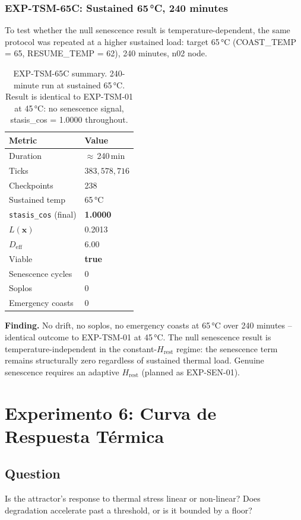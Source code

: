 \documentclass[11pt, a4paper]{article}
\begin{document}
\subsubsection*{EXP-TSM-65C: Sustained 65\,°C, 240 minutes}

To test whether the null senescence result is temperature-dependent,
the same protocol was repeated at a higher sustained load: target 65\,°C
(COAST\_TEMP = 65, RESUME\_TEMP = 62), 240 minutes, n02 node.

\begin{table}[h]
\centering
\begin{tabular}{ll}
\toprule
Metric & Value \\
\midrule
Duration & $\approx$\,240\,min \\
Ticks & $383{,}578{,}716$ \\
Checkpoints & 238 \\
Sustained temp & 65\,°C \\
\texttt{stasis\_cos} (final) & \textbf{1.0000} \\
$L(\mathbf{x})$ & 0.2013 \\
$D_\text{eff}$ & 6.00 \\
Viable & \textbf{true} \\
Senescence cycles & 0 \\
Soplos & 0 \\
Emergency coasts & 0 \\
\bottomrule
\end{tabular}
\caption{EXP-TSM-65C summary. 240-minute run at sustained 65\,°C.
Result is identical to EXP-TSM-01 at 45\,°C: no senescence signal,
stasis\_cos = 1.0000 throughout.}
\label{tab:tsm65c}
\end{table}

\textbf{Finding.}
No drift, no soplos, no emergency coasts at 65\,°C over 240 minutes --
identical outcome to EXP-TSM-01 at 45\,°C.
The null senescence result is temperature-independent in the
constant-$H_\text{rest}$ regime: the senescence term remains structurally
zero regardless of sustained thermal load.
Genuine senescence requires an adaptive $H_\text{rest}$ (planned as
EXP-SEN-01).

\section{Experimento 6: Curva de Respuesta Térmica}
\label{sec:thermal_ladder}

\subsection*{Question} Is the attractor's response to thermal stress linear
or non-linear?
Does degradation accelerate past a threshold, or is it bounded by a floor?
\end{document}
